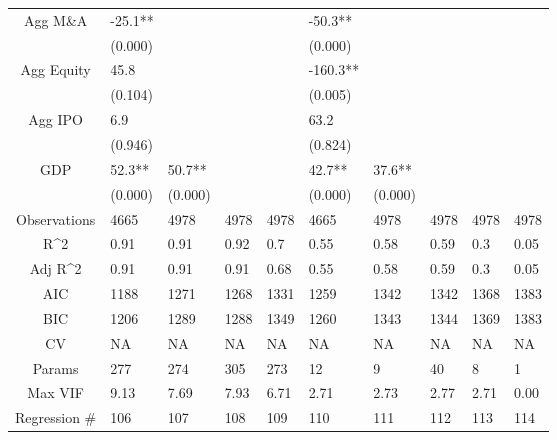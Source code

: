 \documentclass{article}
\begin{document}
\begin{table}[H]
\begin{tabular}{|clllllllll|}
  Agg M\&A & -25.1** &  &  &  & -50.3** &  &  &  &  \\
   & (0.000) &  &  &  & (0.000) &  &  &  &  \\
  Agg Equity & 45.8 &  &  &  & -160.3** &  &  &  &  \\
   & (0.104) &  &  &  & (0.005) &  &  &  &  \\
  Agg IPO & 6.9 &  &  &  & 63.2 &  &  &  &  \\
   & (0.946) &  &  &  & (0.824) &  &  &  &  \\
  GDP & 52.3** & 50.7** &  &  & 42.7** & 37.6** &  &  &  \\
   & (0.000) & (0.000) &  &  & (0.000) & (0.000) &  &  &  \\
  \hline
 Observations & 4665 & 4978 & 4978 & 4978 & 4665 & 4978 & 4978 & 4978 & 4978 \\
  R^2 & 0.91 & 0.91 & 0.92 & 0.7 & 0.55 & 0.58 & 0.59 & 0.3 & 0.05 \\
  Adj R^2 & 0.91 & 0.91 & 0.91 & 0.68 & 0.55 & 0.58 & 0.59 & 0.3 & 0.05 \\
  AIC & 1188 & 1271 & 1268 & 1331 & 1259 & 1342 & 1342 & 1368 & 1383 \\
  BIC & 1206 & 1289 & 1288 & 1349 & 1260 & 1343 & 1344 & 1369 & 1383 \\
  CV & NA & NA & NA & NA & NA & NA & NA & NA & NA \\
  Params & 277 & 274 & 305 & 273 & 12 & 9 & 40 & 8 & 1 \\
  Max VIF & 9.13 & 7.69 & 7.93 & 6.71 & 2.71 & 2.73 & 2.77 & 2.71 & 0.00 \\
  Regression \# & 106 & 107 & 108 & 109 & 110 & 111 & 112 & 113 & 114 \\
   \hline
\end{tabular}

\end{table}
\end{document}
